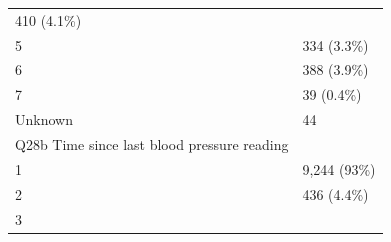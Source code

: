 \documentclass[]{article}
\begin{document}
\begin{longtable}[]{@{}ll@{}}
\begin{minipage}[t]{0.23\columnwidth}
410 (4.1\%)\strut
\end{minipage}\tabularnewline
\begin{minipage}[t]{0.71\columnwidth}\raggedright
5\strut
\end{minipage} & \begin{minipage}[t]{0.23\columnwidth}\raggedright
334 (3.3\%)\strut
\end{minipage}\tabularnewline
\begin{minipage}[t]{0.71\columnwidth}\raggedright
6\strut
\end{minipage} & \begin{minipage}[t]{0.23\columnwidth}\raggedright
388 (3.9\%)\strut
\end{minipage}\tabularnewline
\begin{minipage}[t]{0.71\columnwidth}\raggedright
7\strut
\end{minipage} & \begin{minipage}[t]{0.23\columnwidth}\raggedright
39 (0.4\%)\strut
\end{minipage}\tabularnewline
\begin{minipage}[t]{0.71\columnwidth}\raggedright
Unknown\strut
\end{minipage} & \begin{minipage}[t]{0.23\columnwidth}\raggedright
44\strut
\end{minipage}\tabularnewline
\begin{minipage}[t]{0.71\columnwidth}\raggedright
Q28b Time since last blood pressure reading\strut
\end{minipage} & \begin{minipage}[t]{0.23\columnwidth}\raggedright
\strut
\end{minipage}\tabularnewline
\begin{minipage}[t]{0.71\columnwidth}\raggedright
1\strut
\end{minipage} & \begin{minipage}[t]{0.23\columnwidth}\raggedright
9,244 (93\%)\strut
\end{minipage}\tabularnewline
\begin{minipage}[t]{0.71\columnwidth}\raggedright
2\strut
\end{minipage} & \begin{minipage}[t]{0.23\columnwidth}\raggedright
436 (4.4\%)\strut
\end{minipage}\tabularnewline
\begin{minipage}[t]{0.71\columnwidth}\raggedright
3\strut
\end{minipage} & \begin{minipage}[t]{0.23\columnwidth}\raggedright

\end{minipage}
\end{longtable}
\end{document}
